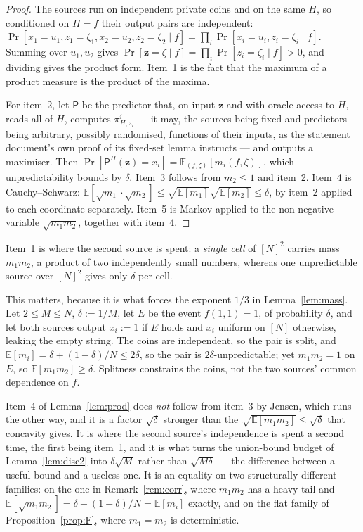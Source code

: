 \documentclass{aicr-solution}
\newcommand{\Prob}[1]{\Pr\!\left[#1\right]}
\newcommand{\Exp}{\mathbb{E}}
\newcommand{\vz}{\mathbf{z}}
\begin{document}
\begin{proof}
The sources run on independent private coins and on the same $H$, so conditioned
on $H=f$ their output pairs are independent:
$\Prob{x_1=u_1,z_1=\zeta_1,x_2=u_2,z_2=\zeta_2\mid f}=\prod_i\Prob{x_i=u_i,z_i=\zeta_i\mid f}$.
Summing over $u_1,u_2$ gives
$\Prob{\vz=\zeta\mid f}=\prod_i\Prob{z_i=\zeta_i\mid f}>0$, and dividing gives the
product form. Item~1 is the fact that the maximum of a product measure is the
product of the maxima.

For item~2, let $\mathsf P$ be the predictor that, on input $\vz$ and with oracle
access to $H$, reads all of $H$, computes $\pi^{i}_{H,z_i}$ --- it may, the
sources being fixed and predictors being arbitrary, possibly randomised,
functions of their inputs, as the statement document's own proof of its
fixed-set lemma instructs --- and outputs a maximiser. Then
$\Prob{\mathsf P^{H}(\vz)=x_i}=\Exp_{(f,\zeta)}[m_i(f,\zeta)]$, which
unpredictability bounds by $\delta$. Item~3 follows from $m_2\le1$ and item~2.
Item~4 is Cauchy--Schwarz:
$\Exp[\sqrt{m_1}\cdot\sqrt{m_2}]\le\sqrt{\Exp[m_1]}\sqrt{\Exp[m_2]}\le\delta$, by
item~2 applied to each coordinate separately. Item~5 is Markov applied to the
non-negative variable $\sqrt{m_1m_2}$, together with item~4.
\end{proof}

Item~1 is where the second source is spent: a \emph{single cell} of $[N]^2$
carries mass $m_1m_2$, a product of two independently small numbers, whereas one
unpredictable source over $[N]^2$ gives only $\delta$ per cell.

\begin{remark}[{$\Exp[m_1m_2]\le\delta^{2}$ is false}]\label{rem:corr}
This matters, because it is what forces the exponent $1/3$ in
Lemma~\ref{lem:mass}. Let $2\le M\le N$, $\delta:=1/M$, let $E$ be the event
$f(1,1)=1$, of probability $\delta$, and let both sources output $x_i:=1$ if $E$
holds and $x_i$ uniform on $[N]$ otherwise, leaking the empty string. The coins
are independent, so the pair is split, and
$\Exp[m_i]=\delta+(1-\delta)/N\le2\delta$, so the pair is
$2\delta$-unpredictable; yet $m_1m_2=1$ on $E$, so $\Exp[m_1m_2]\ge\delta$.
Splitness constrains the coins, not the two sources' common dependence on $f$.
\end{remark}

\begin{remark}\label{rem:cs}
Item~4 of Lemma~\ref{lem:prod} does \emph{not} follow from item~3 by Jensen, which
runs the other way, and it is a factor $\sqrt\delta$ stronger than the
$\sqrt{\Exp[m_1m_2]}\le\sqrt\delta$ that concavity gives. It is where the second
source's independence is spent a second time, the first being item~1, and it is
what turns the union-bound budget of Lemma~\ref{lem:disc2} into $\delta\sqrt M$
rather than $\sqrt{M\delta}$ --- the difference between a useful bound and a
useless one. It is an equality on two structurally different families: on the one
in Remark~\ref{rem:corr}, where $m_1m_2$ has a heavy tail and
$\Exp[\sqrt{m_1m_2}]=\delta+(1-\delta)/N=\Exp[m_i]$ exactly, and on the flat family
of Proposition~\ref{prop:F}, where $m_1=m_2$ is deterministic.
\end{remark}
\end{document}
